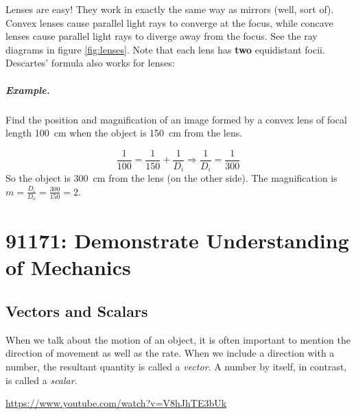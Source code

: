 \documentclass[a4paper]{amsbook}
\begin{document}
Lenses are easy! They work in exactly the same way as mirrors (well, sort of). Convex lenses cause parallel light rays to
converge at the focus, while concave lenses cause parallel light rays to diverge away from the focus. See the ray diagrams
in figure \ref{fig:lenses}. Note that each lens has \textbf{two} equidistant focii. Descartes' formula also works for lenses:

\paragraph{Example.} Find the position and magnification of an image formed by a convex lens of focal length \SI{100}{\centi\metre}
when the object is \SI{150}{\centi\metre} from the lens.

\begin{displaymath}
  \frac{1}{100} = \frac{1}{150} + \frac{1}{D_i} \Rightarrow \frac{1}{D_i} = \frac{1}{300}
\end{displaymath}
So the object is \SI{300}{\centi\metre} from the lens (on the other side). The magnification is $ m = \frac{D_i}{D_o} = \frac{300}{150} = 2 $.

\chapter{91171: Demonstrate Understanding of Mechanics}
\section{Vectors and Scalars}
When we talk about the motion of an object, it is often important to mention the direction of movement as well as the
rate. When we include a direction with a number, the resultant quantity is called a \textit{vector}. A number by itself,
in contrast, is called a \textit{scalar}.

\begin{center}
\begin{tcolorbox}[width=0.8\textwidth,colback={red},title={\textbf{Go and watch...}},colbacktitle=yellow,coltitle=blue]
  \textcolor{white}{\url{https://www.youtube.com/watch?v=V8hJhTE3bUk}}
\end{tcolorbox}
\end{center}
\end{document}
